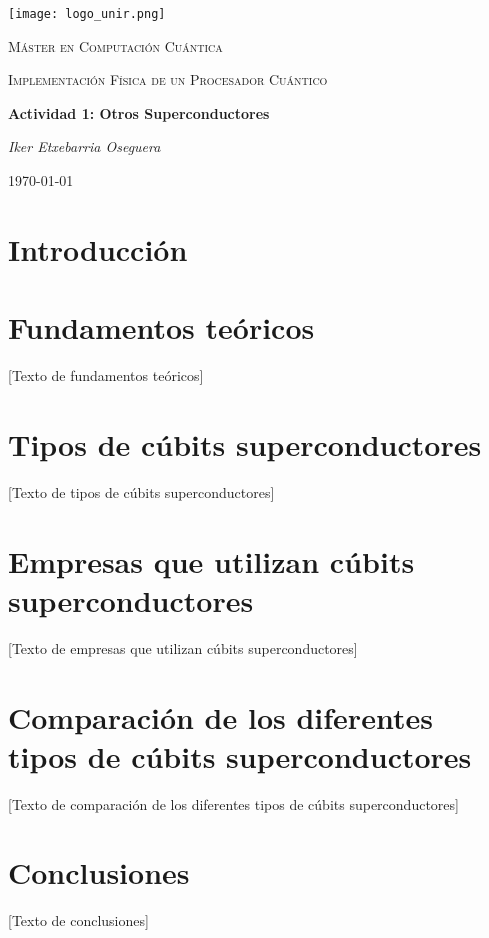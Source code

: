\documentclass[12pt]{article}
\begin{document}
\begin{titlepage}
    \centering
    \texttt{[image: logo\_unir.png]}\par\vspace{1cm}
    \vspace{1cm}
    {\scshape\Large Máster en Computación Cuántica\par}    
    \vspace{1cm}
    {\scshape\Large Implementación Física de un Procesador Cuántico\par}
    \vspace{3cm}
    {\Huge\bfseries Actividad 1: Otros Superconductores\par}
    \vspace{1.5cm}
    {\Large\itshape Iker Etxebarria Oseguera\par}
    \vfill
    {\large \today\par}
\end{titlepage}

\newpage

\section{Introducción}

\section{Fundamentos teóricos}

[Texto de fundamentos teóricos]

\section{Tipos de cúbits superconductores}

[Texto de tipos de cúbits superconductores]

\section{Empresas que utilizan cúbits superconductores}

[Texto de empresas que utilizan cúbits superconductores]

\section{Comparación de los diferentes tipos de cúbits superconductores}

[Texto de comparación de los diferentes tipos de cúbits superconductores]

\section{Conclusiones}

[Texto de conclusiones]


\cite{barends_superconducting_2014}
\printbibliography
\end{document}
